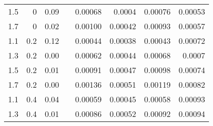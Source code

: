 \begin{table*}[tb]
\begin{center}
\begin{tabular}{rrrrrrrr}
1.5 & 0 & 0.09 &  & 0.00068 & 0.0004 & 0.00076 & 0.00053 \\ 
1.7 & 0 & 0.02 &  & 0.00100 & 0.00042 & 0.00093 & 0.00057 \\ 
1.1 & 0.2 & 0.12 &  & 0.00044 & 0.00038 & 0.00043 & 0.00072 \\ 
1.3 & 0.2 & 0.00 &  & 0.00062 & 0.00044 & 0.00068 & 0.0007 \\ 
1.5 & 0.2 & 0.01 &  & 0.00091 & 0.00047 & 0.00098 & 0.00074 \\ 
1.7 & 0.2 & 0.00 &  & 0.00136 & 0.00051 & 0.00119 & 0.00082 \\ 
1.1 & 0.4 & 0.04 &  & 0.00059 & 0.00045 & 0.00058 & 0.00093 \\ 
1.3 & 0.4 & 0.01 &  & 0.00086 & 0.00052 & 0.00092 & 0.00094 \\ \hline
\end{tabular}
\label{tab:obsdata}
\end{center}
\end{table*}

